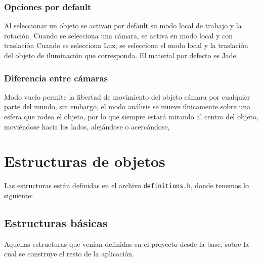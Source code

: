 \documentclass[12pt,a4paper]{article}
\begin{document}
\subsubsection{Opciones por default}

Al seleccionar un objeto se activan por default su modo local de trabajo y la rotación. Cuando se selecciona una cámara, se activa en modo local y con traslación Cuando se selecciona Luz, se selecciona el modo local y la traslación del objeto de iluminación que corresponda. El material por defecto es Jade.


\subsubsection{Diferencia entre cámaras}
Modo vuelo permite la libertad de movimiento del objeto cámara por cualquier parte del mundo, sin embargo, el modo análisis se mueve únicamente sobre una esfera que rodea el objeto, por lo que siempre estará mirando al centro del objeto, moviéndose hacia los lados, alejándose o acercándose,







\newpage
\section{Estructuras de objetos}

Las estructuras están definidas en el archivo \texttt{definitions.h},  donde tenemos lo siguiente:

\subsection{Estructuras básicas}

Aquellas estructuras que venían definidas en el proyecto desde la base, sobre la cual se construye el resto de la aplicación.
\end{document}
